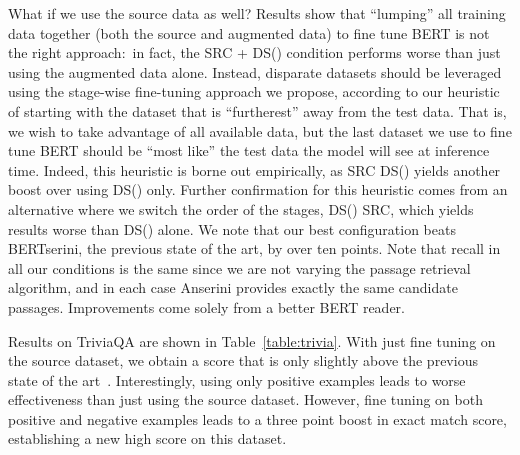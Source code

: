 \documentclass[11pt,a4paper]{article}
\begin{document}
What if we use the source data as well?
Results show that ``lumping'' all training data together (both the source and augmented data) to fine tune BERT is not the right approach:\ in fact, the SRC + DS() condition performs worse than just using the augmented data alone.
Instead, disparate datasets should be leveraged using the stage-wise fine-tuning approach we propose, according to our heuristic of starting with the dataset that is ``furtherest'' away from the test data.
That is, we wish to take advantage of all available data, but the last dataset we use to fine tune BERT should be ``most like'' the test data the model will see at inference time.
Indeed, this heuristic is borne out empirically, as SRC  DS() yields another boost over using DS() only.
Further confirmation for this heuristic comes from an alternative where we switch the order of the stages, DS()  SRC, which yields results worse than DS() alone.
We note that our best configuration beats BERTserini, the previous state of the art, by over ten points.
Note that recall in all our conditions is the same since we are not varying the passage retrieval algorithm, and in each case Anserini provides exactly the same candidate passages.
Improvements come solely from a better BERT reader.

\begin{table}[t]
\centering{}
\caption{Results on TriviaQA}
\label{table:trivia}
\end{table}

Results on TriviaQA are shown in Table~\ref{table:trivia}.
With just fine tuning on the source dataset, we obtain a score that is only slightly above the previous state of the art~\cite{Shuohang2017}.
Interestingly, using only positive examples leads to worse effectiveness than just using the source dataset.
However, fine tuning on both positive and negative examples leads to a three point boost in exact match score, establishing a new high score on this dataset.
\end{document}
